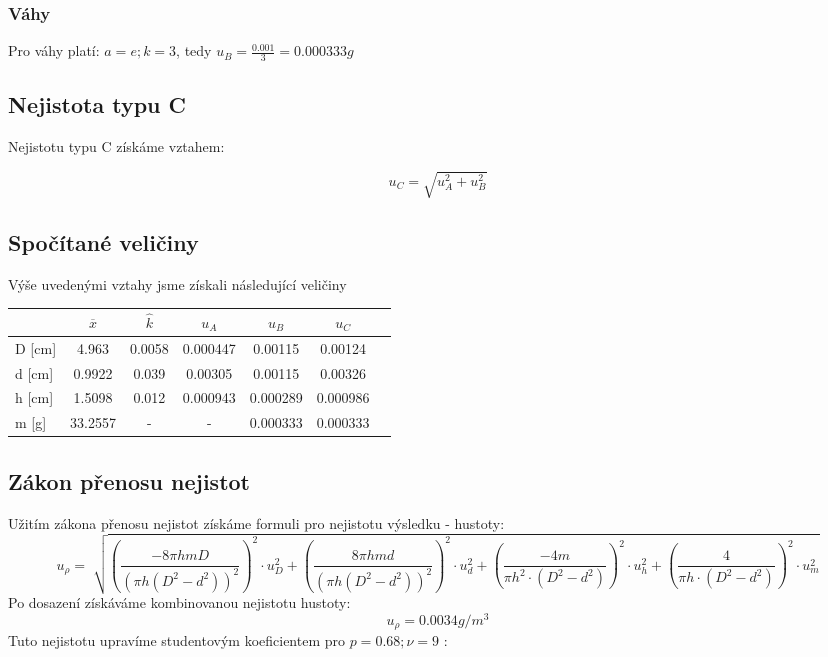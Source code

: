 \documentclass[czech,11pt,a4paper]{article}
\begin{document}
	\subsubsection{Váhy}
	Pro váhy platí: $a=e; k =3$, tedy $ u_B = \frac{0.001}{3} = 0.000333 g$
	
	\subsection{Nejistota typu C}
	Nejistotu typu C získáme vztahem:
	
	\begin{equation}
		u_C = \sqrt{u_A ^2 + u_B ^2}
	\end{equation}
	
	\subsection{Spočítané veličiny}
	Výše uvedenými vztahy jsme získali následující veličiny \\
	
	\quad \quad \quad \quad \quad \quad \quad   \begin{tabular}{||l|c|c|c|c|c|c||}
		\hline
		& $\overline{x}$ & $\hat{k}$ & $u_A$ & $u_B$ & $u_C$ &  \\
		\hline
		D [cm]& 4.963 & 0.0058 & 0.000447 & 0.00115 & 0.00124 &  \\
		\hline
		d [cm]& 0.9922 & 0.039 & 0.00305 & 0.00115 & 0.00326 &  \\
		\hline
		h [cm]& 1.5098 & 0.012 & 0.000943 & 0.000289 & 0.000986 &  \\
		\hline
		m [g]& 33.2557 & - & - & 0.000333 & 0.000333 &  \\
		\hline
	\end{tabular}
	
	
	\subsection{Zákon přenosu nejistot}
	
	
	Užitím zákona přenosu nejistot získáme formuli pro nejistotu výsledku - hustoty:
	{\tiny
	\begin{equation}
		u_{\rho} = \sqrt[]{
			\left(\frac{-8 \pi h m D}{\left(\pi h\left(D^2-d^2\right)\right)^2}\right)^2 \cdot u_D^2 +
			\left(\frac{8 \pi h m d}{\left(\pi h\left(D^2-d^2\right)\right)^2}\right)^2 \cdot u_d^2  +
			\left(\frac{-4 m}{\pi h^2 \cdot\left(D^2-d^2\right)}\right)^2 
			\cdot u_h^2 +
			\left(\frac{4 }{\pi h \cdot\left(D^2-d^2\right)}\right)^2 \cdot u_m^2 }
 	\end{equation}
}
	Po dosazení získáváme kombinovanou nejistotu hustoty:
	\begin{equation*}
		u_\rho = 0.0034 g / m^3
	\end{equation*}
	Tuto nejistotu upravíme studentovým koeficientem pro $ p = 0.68 ; \nu = 9$ :
	
\end{document}
